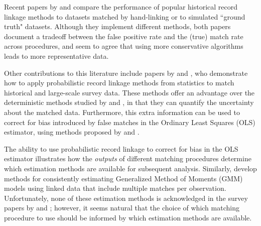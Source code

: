 \documentclass[12pt]{article}
\begin{document}
Recent papers by \citet*{abe2019} and \citet*{bailey2017} compare the performance of popular historical record linkage methods to datasets matched by hand-linking or to simulated ``ground truth" datasets.  Although they implement different methods, both papers document a tradeoff between the false positive rate and the (true) match rate across procedures, and seem to agree that using more conservative algorithms leads to more representative data.  

Other contributions to this literature include papers by \citet*{arp2018} and \citet*{enamorado2019}, who demonstrate how to apply probabilistic record linkage methods from statistics to match historical and large-scale survey data.  These methods offer an advantage over the deterministic methods studied by \citet*{abe2019} and \citet*{bailey2017}, in that they can quantify the uncertainty about the matched data.  Furthermore, this extra information can be used to correct for bias introduced by false matches in the Ordinary Least Squares (OLS) estimator, using methods proposed by \cite{sw1993} and \citet*{lahiri05}.

The ability to use probabilistic record linkage to correct for bias in the OLS estimator illustrates how the \textit{outputs} of different matching procedures determine which estimation methods are available for subsequent analysis.  Similarly, \citet*{ahl2019} develop methods for consistently estimating Generalized Method of Moments (GMM) models using linked data that include multiple matches per observation.  Unfortunately, none of these estimation methods is acknowledged in the survey papers by \citet*{abe2019} and \citet*{bailey2017}; however, it seems natural that the choice of which matching procedure to use should be informed by which estimation methods are available. 



\end{document}
